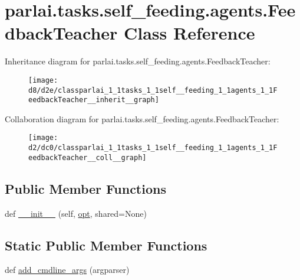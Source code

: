 \hypertarget{classparlai_1_1tasks_1_1self__feeding_1_1agents_1_1FeedbackTeacher}{}\section{parlai.\+tasks.\+self\+\_\+feeding.\+agents.\+Feedback\+Teacher Class Reference}
\label{classparlai_1_1tasks_1_1self__feeding_1_1agents_1_1FeedbackTeacher}


Inheritance diagram for parlai.\+tasks.\+self\+\_\+feeding.\+agents.\+Feedback\+Teacher\+:\nopagebreak
\begin{figure}[H]
\begin{center}
\leavevmode
\texttt{[image: d8/d2e/classparlai\_1\_1tasks\_1\_1self\_\_feeding\_1\_1agents\_1\_1FeedbackTeacher\_\_inherit\_\_graph]}
\end{center}
\end{figure}


Collaboration diagram for parlai.\+tasks.\+self\+\_\+feeding.\+agents.\+Feedback\+Teacher\+:\nopagebreak
\begin{figure}[H]
\begin{center}
\leavevmode
\texttt{[image: d2/dc0/classparlai\_1\_1tasks\_1\_1self\_\_feeding\_1\_1agents\_1\_1FeedbackTeacher\_\_coll\_\_graph]}
\end{center}
\end{figure}
\subsection*{Public Member Functions}
\begin{DoxyCompactItemize}
\item 
def \hyperlink{classparlai_1_1tasks_1_1self__feeding_1_1agents_1_1FeedbackTeacher_aafb96d12c0ae083d89bcf0365c2dfb6e}{\+\_\+\+\_\+init\+\_\+\+\_\+} (self, \hyperlink{classparlai_1_1core_1_1agents_1_1Teacher_a3ce6243860ce978a897922863ed32fa4}{opt}, shared=None)
\end{DoxyCompactItemize}
\subsection*{Static Public Member Functions}
\begin{DoxyCompactItemize}
\item 
def \hyperlink{classparlai_1_1tasks_1_1self__feeding_1_1agents_1_1FeedbackTeacher_ad574b840424ec2d7096639c198af08c7}{add\+\_\+cmdline\+\_\+args} (argparser)
\end{DoxyCompactItemize}

